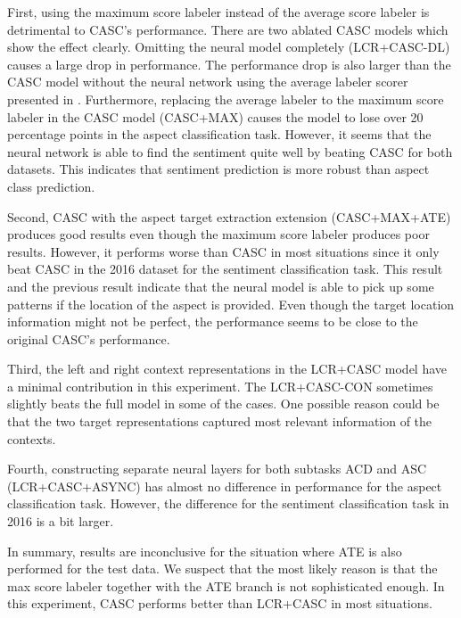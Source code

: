 \documentclass[american, oneside]{ecsgdp}
\begin{document}
First, using the maximum score labeler instead of the average score labeler is detrimental to CASC's performance. There are two ablated CASC models which show the effect clearly. Omitting the neural model completely (LCR+CASC-DL) causes a large drop in performance. The performance drop is also larger than the CASC model without the neural network using the average labeler scorer presented in \textcite{Kumar2021CASC}. Furthermore, replacing the average labeler to the maximum score labeler in the CASC model (CASC+MAX) causes the model to lose over 20 percentage points in the aspect classification task. However, it seems that the neural network is able to find the sentiment quite well by beating CASC for both datasets. This indicates that sentiment prediction is more robust than aspect class prediction. 

Second, CASC with the aspect target extraction extension (CASC+MAX+ATE) produces good results even though the maximum score labeler produces poor results. However, it performs worse than CASC in most situations since it only beat CASC in the 2016 dataset for the sentiment classification task. This result and the previous result indicate that the neural model is able to pick up some patterns if the location of the aspect is provided. Even though the target location information might not be perfect, the performance seems to be close to the original CASC's performance.

Third, the left and right context representations in the LCR+CASC model have a minimal contribution in this experiment. The LCR+CASC-CON sometimes slightly beats the full model in some of the cases. One possible reason could be that the two target representations captured most relevant information of the contexts.

Fourth, constructing separate neural layers for both subtasks ACD and ASC (LCR\-+CASC\-+ASYNC) has almost no difference in performance for the aspect classification task. However, the difference for the sentiment classification task in 2016 is a bit larger. 

In summary, results are inconclusive for the situation where ATE is also performed for the test data. We suspect that the most likely reason is that the max score labeler together with the ATE branch is not sophisticated enough. In this experiment, CASC performs better than LCR+CASC in most situations.
\end{document}
